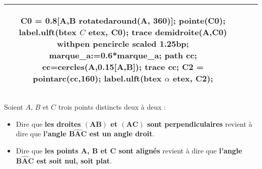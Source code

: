 \begin{changemargin}{0mm}{-15mm}
\begin{definition}[Classement des angles selon leur mesure $\alpha=\widehat{BAC}$]
{\begin{tabular}{|*3{c|}}
\begin{Geometrie}[CoinBG={(-u,-0.5u)},CoinHD={(2.5u,1.5u)}]
            C0 = 0.8[A,B rotatedaround(A, 360)];
            pointe(C0);
            label.ulft(btex $C$ etex, C0);
            trace demidroite(A,C0) withpen pencircle scaled 1.25bp;
            marque_a:=0.6*marque_a;
            path cc;
            cc=cercles(A,0.15[A,B]);
            trace cc;
            C2 = pointarc(cc,160);
            label.ulft(btex $\alpha$ etex, C2);
        \end{Geometrie}\\\hline
    \end{tabular}    
    }
\end{definition}

\begin{propriete}
    Soient $A$, $B$ et $C$ trois points distincts deux à deux :
    \begin{itemize}
        \item Dire que \textbf{les droites $\mathbf{(AB)}$ et $\mathbf{(AC)}$ sont perpendiculaires} revient à dire que \textbf{l'angle $\widehat{\mathbf{BAC}}$ est un angle droit}.
        \item Dire que \textbf{les points $\mathbf{A}$, $\mathbf{B}$ et $\mathbf{C}$ sont alignés} revient à dire que \textbf{l'angle $\widehat{\mathbf{BAC}}$ est soit nul, soit plat}.
    \end{itemize}
\end{propriete}
\end{changemargin}



